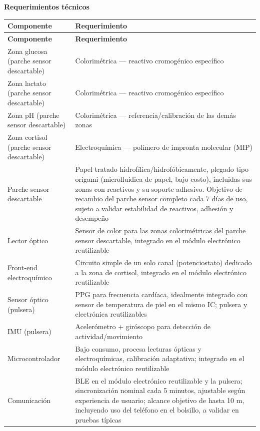 \noindent\textbf{Requerimientos técnicos}
\par\medskip
{\small
\renewcommand{\arraystretch}{1.2}
\begin{xltabular}{\textwidth}{|>{\raggedright\arraybackslash}p{0.28\textwidth}|>{\raggedright\arraybackslash}X|}
\hline
\textbf{Componente} & \textbf{Requerimiento} \\
\hline
\endfirsthead
\hline
\textbf{Componente} & \textbf{Requerimiento} \\
\hline
\endhead
Zona glucosa (parche sensor descartable) & Colorimétrica --- reactivo cromogénico específico \\
\hline
Zona lactato (parche sensor descartable) & Colorimétrica --- reactivo cromogénico específico \\
\hline
Zona pH (parche sensor descartable) & Colorimétrica --- referencia/calibración de las demás zonas \\
\hline
Zona cortisol (parche sensor descartable) & Electroquímica --- polímero de impronta molecular (MIP) \\
\hline
Parche sensor descartable & Papel tratado hidrofílica/hidrofóbicamente, plegado tipo origami (microfluídica de papel, bajo costo), incluidas sus zonas con reactivos y su soporte adhesivo. Objetivo de recambio del parche sensor completo cada 7 días de uso, sujeto a validar estabilidad de reactivos, adhesión y desempeño \\
\hline
Lector óptico & Sensor de color para las zonas colorimétricas del parche sensor descartable, integrado en el módulo electrónico reutilizable \\
\hline
Front-end electroquímico & Circuito simple de un solo canal (potenciostato) dedicado a la zona de cortisol, integrado en el módulo electrónico reutilizable \\
\hline
Sensor óptico (pulsera) & PPG para frecuencia cardíaca, idealmente integrado con sensor de temperatura de piel en el mismo IC; pulsera y electrónica reutilizables \\
\hline
IMU (pulsera) & Acelerómetro + giróscopo para detección de actividad/movimiento \\
\hline
Microcontrolador & Bajo consumo, procesa lecturas ópticas y electroquímicas, calibración adaptativa; integrado en el módulo electrónico reutilizable \\
\hline
Comunicación & BLE en el módulo electrónico reutilizable y la pulsera; sincronización nominal cada 5 minutos, ajustable según experiencia de usuario; alcance objetivo de hasta 10 m, incluyendo uso del teléfono en el bolsillo, a validar en pruebas típicas \\

\end{xltabular}}
